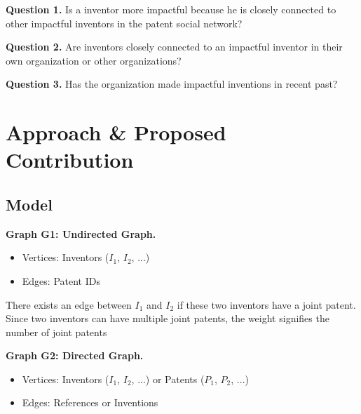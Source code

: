 \documentclass[11pt]{article}
\renewcommand{\paragraph}{\vspace{3pt}\noindent\textbf}
\newcommand{\squish}{
  \setlength{\topsep}{0pt}
  \setlength{\itemsep}{0ex}
  \setlength{\parskip}{0pt}
}
\begin{document}
\paragraph{Question 1.} Is a inventor more impactful because he is closely connected to other impactful inventors in the patent social network? %

\paragraph{Question  2.} Are inventors closely connected to an impactful inventor in their own organization or other organizations? %

\paragraph{Question  3.} Has the organization made impactful inventions in recent past? %

\section{Approach \& Proposed Contribution}

\subsection{Model}

\paragraph{Graph G1: Undirected Graph.}
\begin{itemize}
\item {Vertices:} Inventors  ($I_1$, $I_2$, ...)
\item {Edges:} Patent IDs
\end{itemize}

There exists an edge between $I_1$ and $I_2$ if these two inventors have a joint patent.
Since two inventors can have multiple joint patents, the weight signifies the number of joint patents 

\paragraph{Graph G2: Directed Graph.}
\begin{itemize}
\item {Vertices:} Inventors ($I_1$, $I_2$, ...) or Patents ($P_1$, $P_2$, ...)
\item {Edges:} References or Inventions
\end{itemize}
\end{document}
